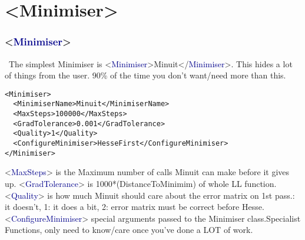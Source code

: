 \documentclass{beamer}
\begin{document}
\section{<Minimiser>}
\begin{frame}[fragile]
\frametitle{<\textcolor{darkblue}{Minimiser}>}
\scriptsize~The simplest Minimiser is <\textcolor{darkblue}{Minimiser}>Minuit</\textcolor{darkblue}{Minimiser}>. This hides a lot of things from the user. 90\% of the time you don't want/need more than this.\newline
{}\tiny
\begin{lstlisting}[tabsize=8]
<Minimiser>
  <MinimiserName>Minuit</MinimiserName>
  <MaxSteps>100000</MaxSteps>
  <GradTolerance>0.001</GradTolerance>
  <Quality>1</Quality>
  <ConfigureMinimiser>HesseFirst</ConfigureMinimiser>
</Minimiser>
\end{lstlisting}\scriptsize
<\textcolor{darkblue}{MaxSteps}> is the Maximum number of calls Minuit can make before it gives up.\newline\newline
<\textcolor{darkblue}{GradTolerance}> is 1000*(DistanceToMinimim) of whole LL function.\newline\newline
<\textcolor{darkblue}{Quality}> is how much Minuit should care about the error matrix on 1st pass.: it doesn't, 1: it does a bit, 2: error matrix must be correct before Hesse.\newline\newline
<\textcolor{darkblue}{ConfigureMinimiser}> special arguments passed to the Minimiser class.\newline Specialist Functions, only need to know/care once you've done a LOT of work.
\end{frame}
\end{document}
